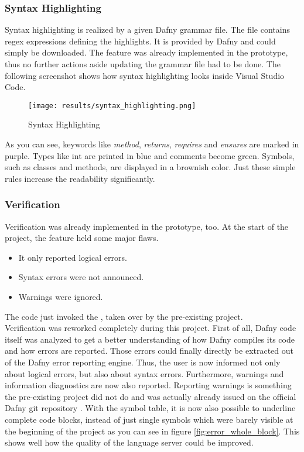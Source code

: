 \subsubsection{Syntax Highlighting}
\label{section:result:syntaxhighgliht}
Syntax highlighting is realized by a given Dafny grammar file.
The file contains regex expressions defining the highlights.
It is provided by Dafny \cite{syntax_update} and could simply be downloaded.
The feature was already implemented in the prototype, thus no further actions aside updating the grammar file had to be done.
The following screenshot shows how syntax highlighting looks inside Visual Studio Code.

\begin{figure}[H]
    \centering
    \texttt{[image: results/syntax\_highlighting.png]}
    \caption{Syntax Highlighting}
    \label{fig:result_syntax_highlight}
\end{figure}

As you can see, keywords like \textit{method}, \textit{returns}, \textit{requires} and \textit{ensures} are marked in purple.
Types like int are printed in blue and comments become green.
Symbols, such as classes and methods, are displayed in a brownish color.
Just these simple rules increase the readability significantly.

\subsubsection{Verification}
Verification was already implemented in the prototype, too.
At the start of the project, the feature held some major flaws.
\begin{itemize}
    \item It only reported logical errors.
    \item Syntax errors were not announced.
    \item Warnings were ignored.
\end{itemize}

The code just invoked the , taken over by the pre-existing project.\\

Verification was reworked completely during this project.
First of all, Dafny code itself was analyzed to get a better understanding of how Dafny compiles its code and how errors are reported.
Those errors could finally directly be extracted out of the Dafny error reporting engine.
Thus, the user is now informed not only about logical errors, but also about syntax errors.
Furthermore, warnings and information diagnostics are now also reported.
Reporting warnings is something the pre-existing project did not do and was actually already issued on the official Dafny git repository \cite{dafny_noWarnings}.
With the symbol table, it is now also possible to underline complete code blocks,
instead of just single symbols which were barely visible at the beginning of the project as you can see in figure \ref{fig:error_whole_block}.
This shows well how the quality of the language server could be improved.


